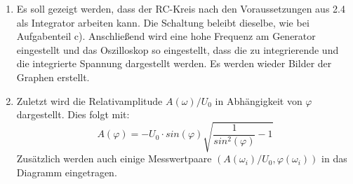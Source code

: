 \begin{enumerate}
       \item Es soll gezeigt werden, dass der RC-Kreis nach den Voraussetzungen aus 2.4 als
       Integrator arbeiten kann. Die Schaltung beleibt dieselbe, wie bei Aufgabenteil c).
       Anschließend wird eine hohe Frequenz am Generator eingestellt und das Oszilloskop so eingestellt, dass
       die zu integrierende und die integrierte Spannung dargestellt werden. Es werden wieder
       Bilder der Graphen erstellt.

       \item Zuletzt wird die Relativamplitude $A(\omega) / U_0$ in Abhängigkeit von $\varphi$ dargestellt.
       Dies folgt mit:
       \begin{equation}
         A(\varphi) = -U_0\cdot sin(\varphi)\sqrt{\frac{1}{sin^2(\varphi)}-1}
       \end{equation}
       Zusätzlich werden auch einige Messwertpaare $(A(\omega_i)/U_0,\varphi(\omega_i))$ in das Diagramm
        eingetragen.

\end{enumerate}

